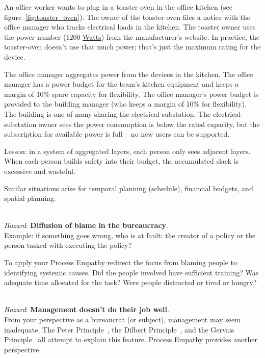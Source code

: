 \begin{mdframed}[frametitle={Layers of Margins},frametitlerule=true,frametitlealignment=\centering]
An office worker wants to plug in a toaster oven in the office kitchen (see figure~\ref{fig:toaster_oven}). The owner of the toaster oven files a notice with the office manager who tracks electrical loads in the kitchen. 
The toaster owner uses the power number (1200 \href{https://en.wikipedia.org/wiki/Watt}{Watts}) 
from the manufacturer's website. In practice, the toaster-oven doesn't  use that much power; that's just the maximum rating for the device. 

The office manager aggregates power from the devices in the kitchen. The office manager has a power budget for the team's kitchen equipment and keeps a margin of 10\% spare capacity for flexibility. The office manager's power budget is provided to the building manager (who keeps a margin of 10\% for flexibility). The building is one of many sharing the electrical substation. The electrical substation owner sees the power consumption is below the rated capacity, but the subscription for available power is full -- no new users can be supported.
\end{mdframed}
Lesson: in a system of aggregated layers, each person only sees adjacent layers. When each person builds safety into their budget, the accumulated slack is excessive and wasteful.

Similar situations arise for temporal planning (schedule), financial budgets, and spatial planning. 


\ \\
\textit{Hazard}: \textbf{Diffusion of blame in the bureaucracy}. \\
Example: if something goes wrong, who is at fault: the creator of a policy or the person tasked with executing the policy?

To apply your Process Empathy redirect the focus from blaming people to identifying systemic causes. Did the people involved have sufficient training? Was adequate time allocated for the task? Were people distracted or tired or hungry? 

\ \\
\textit{Hazard}: \textbf{Management doesn't do their job well}. \\
From your perspective as a bureaucrat (or subject), management may seem inadequate. The Peter Principle~\cite{1970_Peter}, the Dilbert Principle~\cite{1997_Adams}, and the Gervais Principle~\cite{2009_Rao} all attempt to explain this feature. Process Empathy provides another perspective. 


